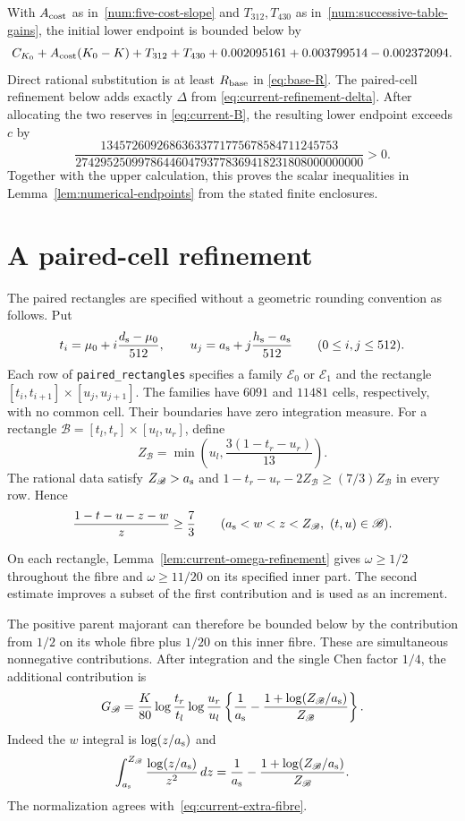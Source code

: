 With $A_{\rm cost}$ as in~\eqref{num:five-cost-slope} and
$T_{312},T_{430}$ as in~\eqref{num:successive-table-gains}, the
initial lower endpoint is bounded below by
\begin{equation}
 C_{K_0}+A_{\rm cost}(K_0-K)+T_{312}+T_{430}
 +0.002095161+0.003799514-0.002372094.
 \label{num:lower-sum}
\end{equation}
Direct rational substitution is at least $R_{\rm base}$ in
\eqref{eq:base-R}.  The paired-cell refinement below adds
exactly $\Delta$ from \eqref{eq:current-refinement-delta}.
After allocating the two reserves in \eqref{eq:current-B},
the resulting lower endpoint exceeds $c$ by
\[
 \frac{13457260926863633771775678584711245753}
 {2742952509978644604793778369418231808000000000}>0.
\]
Together with the upper calculation, this proves the scalar
inequalities in Lemma~\ref{lem:numerical-endpoints} from the
stated finite enclosures.

\section{A paired-cell refinement}\label{app:refinement}

The paired rectangles are specified without a geometric
rounding convention as follows.  Put
\[
 t_i=\mu_0+i\frac{{d_{\rm s}}-\mu_0}{512},\qquad
 u_j={a_{\rm s}}+j\frac{{h_{\rm s}}-{a_{\rm s}}}{512}\qquad(0\le i,j\le512).
\]
Each row of \texttt{paired\_rectangles} specifies a family
$\mathscr E_0$ or $\mathscr E_1$ and the rectangle
$[t_i,t_{i+1}]\times[u_j,u_{j+1}]$.  The families have
$6091$ and $11481$ cells, respectively, with no common
cell.  Their boundaries have zero integration measure.
For a rectangle $\mathscr B=[t_l,t_r]\times[u_l,u_r]$, define
\[
 Z_{\mathscr B}=\min\left(u_l,\frac{3(1-t_r-u_r)}{13}\right).
\]
The rational data satisfy $Z_{\mathscr B}>{a_{\rm s}}$ and
$1-t_r-u_r-2Z_{\mathscr B}\ge(7/3)Z_{\mathscr B}$ in every row.  Hence
\[
 \frac{1-t-u-z-w}{z}\ge\frac73
 \qquad({a_{\rm s}}<w<z<Z_{\mathscr B},\ (t,u)\in \mathscr B).
\]

On each rectangle, Lemma~\ref{lem:current-omega-refinement} gives
$\omega\ge1/2$ throughout the fibre and $\omega\ge11/20$
on its specified inner part. The second estimate improves a
subset of the first contribution and is used as an increment.

The positive parent majorant can therefore be bounded below
by the contribution from $1/2$ on its whole fibre plus
$1/20$ on this inner fibre.  These are simultaneous
nonnegative contributions.  After integration and the
single Chen factor $1/4$, the additional contribution is
\begin{equation}
 G_{\mathscr B}=\frac K{80}\log\frac{t_r}{t_l}\log\frac{u_r}{u_l}
 \left\{\frac1{a_{\rm s}}-\frac{1+\log(Z_{\mathscr B}/{a_{\rm s}})}{Z_{\mathscr B}}\right\}.
 \label{num:paired-extra}
\end{equation}
Indeed the $w$ integral is $\log(z/{a_{\rm s}})$ and
\[
 \int_{a_{\rm s}}^{Z_{\mathscr B}}\frac{\log(z/{a_{\rm s}})}{z^2}\,dz
 =\frac1{a_{\rm s}}-\frac{1+\log(Z_{\mathscr B}/{a_{\rm s}})}{Z_{\mathscr B}}.
\]
The normalization agrees with~\eqref{eq:current-extra-fibre}.

